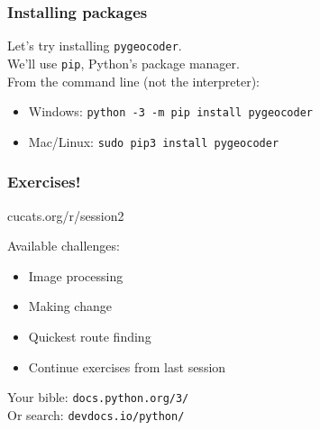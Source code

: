 \documentclass[notes]{beamer}
\begin{document}
	\begin{frame}[fragile]
		\frametitle{Installing packages}
		Let's try installing \colorbox{codebg}{\lstinline|pygeocoder|}.\\
		\vspace{10pt}
		We'll use \colorbox{codebg}{\lstinline|pip|}, Python's package manager.\\
		\vspace{10pt}
		From the command line (not the interpreter):
		\begin{itemize}
			\item Windows: \colorbox{codebg}{\lstinline|python -3 -m pip install pygeocoder|}
			\item Mac/Linux: \colorbox{codebg}{\lstinline|sudo pip3 install pygeocoder|}
		\end{itemize}
	\end{frame}

	\begin{frame}[fragile]
		\frametitle{Exercises!}
		\vfill
		\centerline{\LARGE cucats.org/r/session2}
		\vfill
		Available challenges:
		\begin{itemize}
			\item Image processing
			\item Making change
			\item Quickest route finding
			\item Continue exercises from last session
		\end{itemize}
		\vspace{10pt}
		Your bible: \lstinline|docs.python.org/3/|\\
		Or search: \lstinline|devdocs.io/python/|
	\end{frame}
\end{document}
